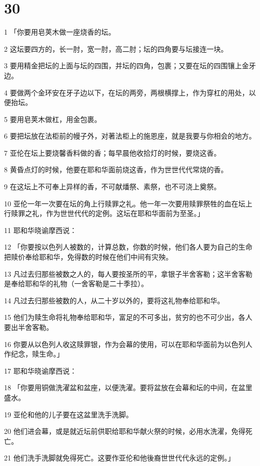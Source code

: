 \chapter{30}

\par 1 「你要用皂荚木做一座烧香的坛。
\par 2 这坛要四方的，长一肘，宽一肘，高二肘；坛的四角要与坛接连一块。
\par 3 要用精金把坛的上面与坛的四围，并坛的四角，包裹；又要在坛的四围镶上金牙边。
\par 4 要做两个金环安在牙子边以下，在坛的两旁，两根横撑上，作为穿杠的用处，以便抬坛。
\par 5 要用皂荚木做杠，用金包裹。
\par 6 要把坛放在法柜前的幔子外，对著法柜上的施恩座，就是我要与你相会的地方。
\par 7 亚伦在坛上要烧馨香料做的香；每早晨他收拾灯的时候，要烧这香。
\par 8 黄昏点灯的时候，他要在耶和华面前烧这香，作为世世代代常烧的香。
\par 9 在这坛上不可奉上异样的香，不可献燔祭、素祭，也不可浇上奠祭。
\par 10 亚伦一年一次要在坛的角上行赎罪之礼。他一年一次要用赎罪祭牲的血在坛上行赎罪之礼，作为世世代代的定例。这坛在耶和华面前为至圣。」
\par 11 耶和华晓谕摩西说：
\par 12 「你要按以色列人被数的，计算总数，你数的时候，他们各人要为自己的生命把赎价奉给耶和华，免得数的时候在他们中间有灾殃。
\par 13 凡过去归那些被数之人的，每人要按圣所的平，拿银子半舍客勒；这半舍客勒是奉给耶和华的礼物（一舍客勒是二十季拉）。
\par 14 凡过去归那些被数的人，从二十岁以外的，要将这礼物奉给耶和华。
\par 15 他们为赎生命将礼物奉给耶和华，富足的不可多出，贫穷的也不可少出，各人要出半舍客勒。
\par 16 你要从以色列人收这赎罪银，作为会幕的使用，可以在耶和华面前为以色列人作纪念，赎生命。」
\par 17 耶和华晓谕摩西说：
\par 18 「你要用铜做洗濯盆和盆座，以便洗濯。要将盆放在会幕和坛的中间，在盆里盛水。
\par 19 亚伦和他的儿子要在这盆里洗手洗脚。
\par 20 他们进会幕，或是就近坛前供职给耶和华献火祭的时候，必用水洗濯，免得死亡。
\par 21 他们洗手洗脚就免得死亡。这要作亚伦和他後裔世世代代永远的定例。」
